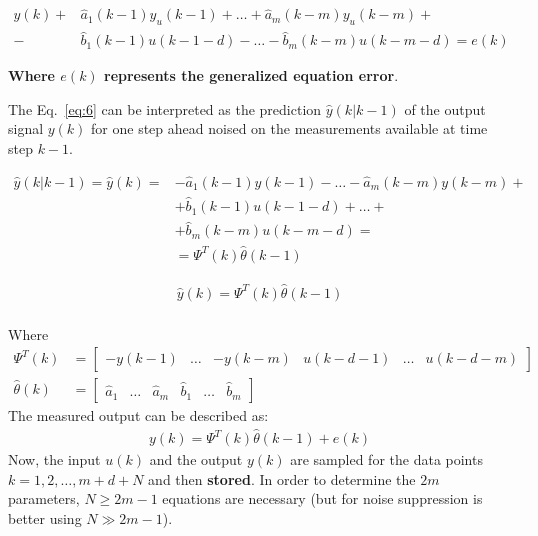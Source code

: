 \documentclass[12pt,a4paper,oneside]{book}
\begin{document}
\begin{onehalfspace}
\begin{equation}\label{eq:6}
	\begin{aligned}
		y(k)+ & \hat{a}_{1}(k-1)y_u(k-1)+\dots+\hat{a}_{m}(k-m)y_u(k-m)+ \\[6pt]
		-&\hat{b}_{1}(k-1)u(k-1-d)-\dots-\hat{b}_{m}(k-m)u(k-m-d)=e(k)
	\end{aligned}
\end{equation}

\noindent\textbf{Where $e(k)$ represents the generalized equation error}.

The Eq.~\eqref{eq:6} can be interpreted as the prediction $\hat{y}(k|k-1)$ of 
the output signal $y(k)$ for one step ahead noised on the measurements 
available at time step $k-1$.

\begin{equation}\label{eq:7}
	\begin{aligned}
		\hat{y}(k|k-1) = \hat{y}(k) = & 
		-\hat{a}_{1}(k-1)y(k-1)-\dots-\hat{a}_{m}(k-m)y(k-m)+ \\[6pt]
		& + \hat{b}_{1}(k-1)u(k-1-d)+\dots+ \\[6pt]
		& +\hat{b}_{m}(k-m)u(k-m-d)= \\[6pt]
		&= \Psi^T(k)\hat{\theta}(k-1)
	\end{aligned}
\end{equation}

\begin{equation}\label{eq:8}
	\begin{aligned}
		\boxed{\hat{y}(k) = \Psi^T(k)\hat{\theta}(k-1)}
	\end{aligned}
\end{equation} \\
Where \\
\begin{equation}\label{eq:9}
	\begin{aligned}
		\Psi^T(k) & = 
		\begin{bmatrix}
			-y(k-1) & \dots & -y(k-m) & u(k-d-1) & \dots & u(k-d-m)
		\end{bmatrix}      \\[6pt]
		\hat{\theta}(k) & =
		\begin{bmatrix}
			\hat{a}_1 & \dots & \hat{a}_m & \hat{b}_1 & \dots &  \hat{b}_m
		\end{bmatrix} 
	\end{aligned}
\end{equation}
The measured output can be described as:
\begin{equation}\label{eq:10}
	\begin{aligned}
		\boxed{y(k) = \Psi^T(k)\hat{\theta}(k-1)+e(k)}
	\end{aligned}
\end{equation}
Now, the input $u(k)$ and the output $y(k)$ are sampled for the data points $k 
= 1,2,\dots,m+d+N$ and then \textbf{stored}. In order to determine the $2m$ 
parameters, $N\geq2m-1$ equations are necessary (but for noise suppression is 
better using $N\gg2m-1$). 


\end{onehalfspace}
\end{document}
